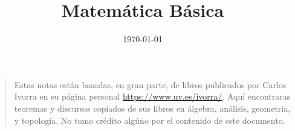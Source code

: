\documentclass[article,oneside,10pt]{memoir}
\theoremstyle{plain}
\theoremstyle{definition}
\begin{document}
\author{\href{mailto:\authoremail}{\documentauthor}}
\title{Matemática Básica}
\date{\today}

\maketitle
\tableofcontents

\begin{quote}
Estas notas están basadas, en gran parte, de libros publicados por Carlos
Ivorra en su página personal \url{https://www.uv.es/ivorra/}. Aquí
encontraras teoremas y discursos copiados de sus libros en álgebra,
análisis, geometría, y topología. No tomo crédito algúno por el contenido
de este documento.
\end{quote}

% 




% 
\end{document}
